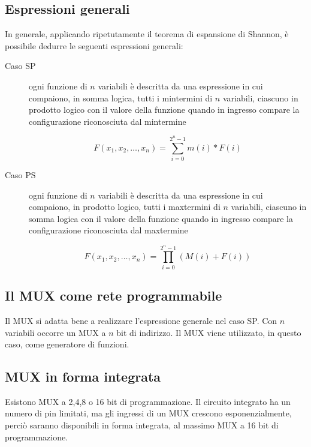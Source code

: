 \documentclass{subfiles}
\begin{document}
\subsection{Espressioni generali}

In generale, applicando ripetutamente il teorema di espansione di Shannon, è possibile dedurre le seguenti espressioni generali:

\begin{description}
	\item[Caso SP] ogni funzione di $n$ variabili è descritta da una espressione in cui compaiono, in somma logica, tutti i mintermini di $n$ variabili, ciascuno in prodotto logico con il valore della funzione quando in ingresso compare la configurazione riconosciuta dal mintermine

	$$
    F(x_1, x_2, \dots, x_n) = \sum_{i=0}^{2^n-1} m(i) * F(i)
    $$

	\item[Caso PS] ogni funzione di $n$ variabili è descritta da una espressione in cui compaiono, in prodotto logico, tutti i maxtermini di $n$ variabili, ciascuno in somma logica con il valore della funzione quando in ingresso compare la configurazione riconosciuta dal maxtermine

	$$
    F(x_1, x_2, \dots, x_n) = \prod_{i=0}^{2^n-1} (M(i) + F(i))
    $$
\end{description}

\subsection{Il MUX come rete programmabile}

Il MUX si adatta bene a realizzare l'espressione generale nel caso SP.
Con $n$ variabili occorre un MUX a $n$ bit di indirizzo.
Il MUX viene utilizzato, in questo caso, come generatore di funzioni.

\subsection{MUX in forma integrata}

Esistono MUX a 2,4,8 o 16 bit di programmazione.
Il circuito integrato ha un numero di pin limitati, ma gli ingressi di un MUX crescono esponenzialmente, perciò saranno disponibili in forma integrata, al massimo MUX a 16 bit di programmazione.
\end{document}
